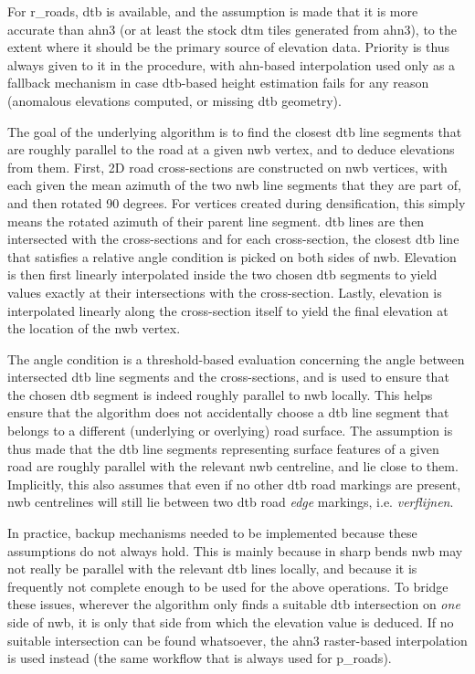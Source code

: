 For \ac{r_roads}, \ac{dtb} is available, and the assumption is made that it is more accurate than \ac{ahn3} (or at least the stock \ac{dtm} tiles generated from \ac{ahn3}), to the extent where it should be the primary source of elevation data. Priority is thus always given to it in the procedure, with \ac{ahn}-based interpolation used only as a fallback mechanism in case \ac{dtb}-based height estimation fails for any reason (anomalous elevations computed, or missing \ac{dtb} geometry).

The goal of the underlying algorithm is to find the closest \ac{dtb} line segments that are roughly parallel to the road at a given \ac{nwb} vertex, and to deduce elevations from them. First, 2D road cross-sections are constructed on \ac{nwb} vertices, with each given the mean azimuth of the two \ac{nwb} line segments that they are part of, and then rotated 90 degrees. For vertices created during densification, this simply means the rotated azimuth of their parent line segment. \ac{dtb} lines are then intersected with the cross-sections and for each cross-section, the closest \ac{dtb} line that satisfies a relative angle condition is picked on both sides of \ac{nwb}. Elevation is then first linearly interpolated inside the two chosen \ac{dtb} segments to yield values exactly at their intersections with the cross-section. Lastly, elevation is interpolated linearly along the cross-section itself to yield the final elevation at the location of the \ac{nwb} vertex.

The angle condition is a threshold-based evaluation concerning the angle between intersected \ac{dtb} line segments and the cross-sections, and is used to ensure that the chosen \ac{dtb} segment is indeed roughly parallel to \ac{nwb} locally. This helps ensure that the algorithm does not accidentally choose a \ac{dtb} line segment that belongs to a different (underlying or overlying) road surface. The assumption is thus made that the \ac{dtb} line segments representing surface features of a given road are roughly parallel with the relevant \ac{nwb} centreline, and lie close to them. Implicitly, this also assumes that even if no other \ac{dtb} road markings are present, \ac{nwb} centrelines will still lie between two \ac{dtb} road \textit{edge} markings, i.e. \textit{verflijnen}.

In practice, backup mechanisms needed to be implemented because these assumptions do not always hold. This is mainly because in sharp bends \ac{nwb} may not really be parallel with the relevant \ac{dtb} lines locally, and because it is frequently not complete enough to be used for the above operations. To bridge these issues, wherever the algorithm only finds a suitable \ac{dtb} intersection on \textit{one} side of \ac{nwb}, it is only that side from which the elevation value is deduced. If no suitable intersection can be found whatsoever, the \ac{ahn3} raster-based interpolation is used instead (the same workflow that is always used for \ac{p_roads}).

